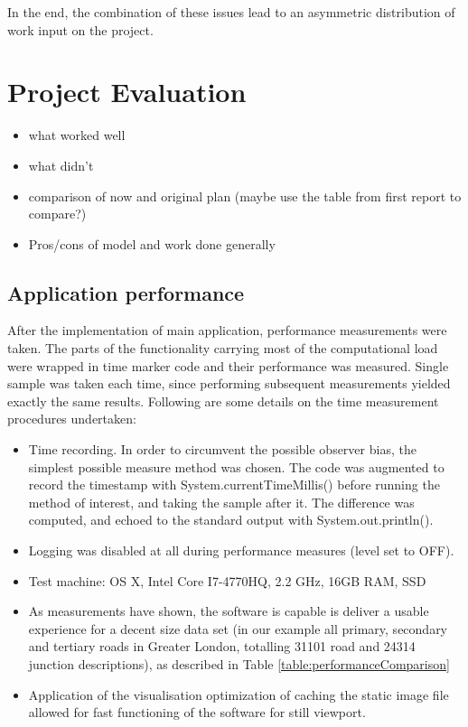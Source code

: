 In the end, the combination of these issues lead to an asymmetric distribution of work input on the project.

\section{Project Evaluation}

\begin{itemize}
	\item what worked well
	\item what didn't
	\item comparison of now and original plan (maybe use the table from first report to compare?)
	\item Pros/cons of model and work done generally
\end{itemize}


\subsection{Application performance}
After the implementation of main application, performance measurements were taken. The parts of the functionality carrying most of the computational load were wrapped in time marker code and their performance was measured. Single sample was taken each time, since performing subsequent measurements yielded exactly the same results. Following are some details on the time measurement procedures undertaken:

\begin{itemize}
    \item Time recording. In order to circumvent the possible observer bias, the simplest possible measure method was chosen. The code was augmented to record the timestamp with System.currentTimeMillis() before running the method of interest, and taking the sample after it. The difference was computed, and echoed to the standard output with System.out.println().
    \item Logging was disabled at all during performance measures (level set to OFF).
    \item Test machine: OS X, Intel Core I7-4770HQ, 2.2 GHz, 16GB RAM, SSD
    \item As measurements have shown, the software is capable is deliver a usable experience for a decent size data set (in our example all primary, secondary and tertiary roads in Greater London, totalling 31101 road and 24314 junction descriptions), as described in Table \ref{table:performanceComparison}
    \item Application of the visualisation optimization of caching the static image file allowed for fast functioning of the software for still viewport.
\end{itemize}

